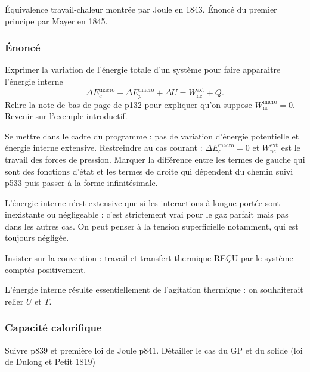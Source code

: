 \begin{remarque}
Équivalence travail-chaleur montrée par Joule en 1843.
Énoncé du premier principe par Mayer en 1845.
\end{remarque}

\subsubsection{Énoncé}

Exprimer la variation de l'énergie totale d'un système pour faire apparaitre l'énergie interne
\begin{equation}
\Delta E_c^\mathrm{macro} + \Delta E_p^\mathrm{macro} + \Delta U = W_\mathrm{nc}^\mathrm{ext} + Q.
\end{equation}
Relire la note de bas de page de \cite{Olivier1998} p132 pour expliquer qu'on suppose $W_\mathrm{nc}^\mathrm{micro} = 0$.
Revenir sur l'exemple introductif.

Se mettre dans le cadre du programme : pas de variation d'énergie potentielle et énergie interne extensive.
Restreindre au cas courant : $\Delta E_c^\mathrm{macro}=0$ et $W_\mathrm{nc}^\mathrm{ext}$ est le travail des forces de pression.
Marquer la différence entre les termes de gauche qui sont des fonctions d'état et les termes de droite qui dépendent du chemin suivi \cite{Michel2017} p533 puis passer à la forme infinitésimale.
\begin{remarque}
L'énergie interne n'est extensive que si les interactions à longue portée sont inexistante ou négligeable : c'est strictement vrai pour le gaz parfait mais pas dans les autres cas.
On peut penser à la tension superficielle notamment, qui est toujours négligée.
\end{remarque}

Insister sur la convention : travail et transfert thermique REÇU par le système comptés positivement.

\begin{transition}
L'énergie interne résulte essentiellement de l'agitation thermique : on souhaiterait relier $U$ et $T$.
\end{transition}

\subsubsection{Capacité calorifique}

Suivre \cite{Salamito2016} p839 et première loi de Joule p841.
Détailler le cas du GP et du solide (loi de Dulong et Petit 1819)

